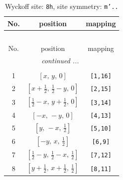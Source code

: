\documentclass[fleqn,8pt]{jsarticle}
\begin{document}
\begin{longtable}{ccc}
\caption{Wyckoff site: {\tt 8h}, site symmetry: {\tt m'..}}
 \\
 \hline \hline
No. & position & mapping \\ \hline \endfirsthead

\multicolumn{2}{l}{\tablename\ \thetable{}} \\
 \hline \hline
No. & position & mapping \\ \hline \endhead

 \hline \hline
\multicolumn{2}{r}{\footnotesize\it continued ...} \\ \endfoot

 \hline \hline
\multicolumn{2}{r}{} \\ \endlastfoot

1 & $\left[ x,\, y,\, 0 \right]$ & {\tt [1,16]} \\ \hline
2 & $\left[ x + \frac{1}{2},\, \frac{1}{2} - y,\, 0 \right]$ & {\tt [2,15]} \\ \hline
3 & $\left[ \frac{1}{2} - x,\, y + \frac{1}{2},\, 0 \right]$ & {\tt [3,14]} \\ \hline
4 & $\left[ - x,\, - y,\, 0 \right]$ & {\tt [4,13]} \\ \hline
5 & $\left[ y,\, - x,\, \frac{1}{2} \right]$ & {\tt [5,10]} \\ \hline
6 & $\left[ - y,\, x,\, \frac{1}{2} \right]$ & {\tt [6,9]} \\ \hline
7 & $\left[ \frac{1}{2} - y,\, \frac{1}{2} - x,\, \frac{1}{2} \right]$ & {\tt [7,12]} \\ \hline
8 & $\left[ y + \frac{1}{2},\, x + \frac{1}{2},\, \frac{1}{2} \right]$ & {\tt [8,11]} \\
\end{longtable}
\renewcommand{\arraystretch}{1.2}
\end{document}

